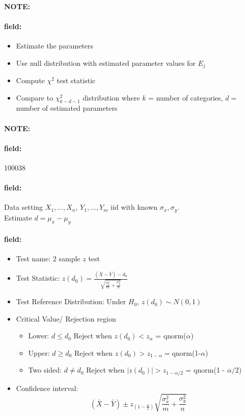 \documentclass[12pt]{article}
\newenvironment{note}{\paragraph{NOTE:}}{}
\newenvironment{field}{\paragraph{field:}}{}
\begin{document}
\begin{note}
\begin{field}
\begin{itemize}
         \begin{itemize}
          \item Estimate the parameters
          \item Use null distribution with estimated parameter values for $E_j$
          \item Compute $\chi^2$ test statistic
          \item Compare to $\chi_{k-d-1}^2$ distribution where $k$ = number of categories, $d = $ number of estimated parameters
         \end{itemize}
  \end{itemize}
 \end{field}
\end{note}


\begin{note} \begin{field} \tiny 100038 \end{field}
 \begin{field}
  Data setting $X_1, \ldots , X_n$, $Y_1, \ldots, Y_m$ iid with known $\sigma_x, \sigma_y$.\\ Estimate $d = \mu_x - \mu_y$

 \end{field}
 \begin{field}
  \begin{itemize}
   \item Test name: 2 sample $z$ test
   \item Test Statistic: $z(d_0) = \frac{(\bar{X}- \bar{Y}) - d_0}{\sqrt{\frac{\sigma_x^2}{m} + \frac{\sigma_y^2}{n}}}$
   \item Test Reference Distribution: Under $H_0$, $z(d_0) \sim N(0,1)$
   \item Critical Value/ Rejection region
         \begin{itemize}
          \item Lower: $d \leq d_0$ Reject when $z(d_0) < z_{\alpha}$ = qnorm($\alpha$)
          \item Upper: $d \geq d_0$ Reject when $z(d_0) > z_{1 - \alpha} = $qnorm(1-$\alpha$)
          \item Two sided: $d \neq d_0$ Reject when $|z(d_0)| > z_{1 - \alpha/2}$ = qnorm(1 - $\alpha/2$)
         \end{itemize}
   \item Confidence interval: $$ (\bar{X} - \bar{Y}) \pm z_{(1 - \frac{\alpha}{2})}\sqrt{\frac{\sigma_x^2}{m} + \frac{\sigma_y^2}{n}} $$
  \end{itemize}
 \end{field}
\end{note}
\end{document}
